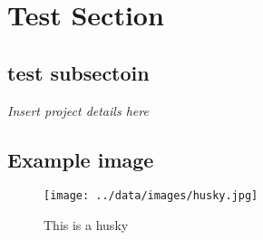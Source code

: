 \documentclass{article}%
\begin{document}
%
\normalsize%
\section{Test Section}%
\label{sec:TestSection}%
\subsection{test subsectoin}%
\label{subsec:testsubsectoin}%
\textit{Insert project details here}

%
\subsection{Example image}%
\label{subsec:Exampleimage}%


\begin{figure}[h]%
\centering%
\texttt{[image: ../data/images/husky.jpg]}%
\caption{This is a husky}%
\end{figure}

%
\end{document}

